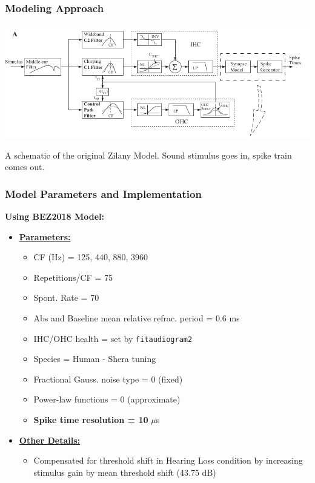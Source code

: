 \documentclass[aspectratio=1610]{beamer}
\begin{document}
\begin{frame}
\frametitle{Modeling Approach}


\centering

\includegraphics[width = 1\textwidth]{bruce} \vspace{.5em}
 
A schematic of the original Zilany Model. Sound stimulus goes in, spike train comes out. 

\end{frame}


\begin{frame}
\frametitle{Model Parameters and Implementation}
\textbf{Using BEZ2018 Model:}\vspace{.5em}

\begin{itemize}
\item \textbf{\underline{Parameters:}}
\begin{itemize}[label = $\blacktriangleright$]
\item CF (Hz) = 125, 440, 880, 3960
\item Repetitions/CF = 75
\item Spont. Rate = 70
\item Abs and Baseline mean relative refrac. period = 0.6 ms
\item IHC/OHC health = set by \texttt{fitaudiogram2}
\item Species = Human - Shera tuning
\item Fractional Gauss. noise type = 0 (fixed)
\item Power-law functions = 0 (approximate)
\item \textbf{Spike time resolution = 10} $\mu$s
\end{itemize}\vspace{.5em}

\item \textbf{\underline{Other Details:}}
\begin{itemize}[label = $\blacktriangleright$]
\item Compensated for threshold shift in Hearing Loss condition by increasing stimulus gain by mean threshold shift (43.75 dB)
\end{itemize}
\end{itemize}

\end{frame}
\end{document}
